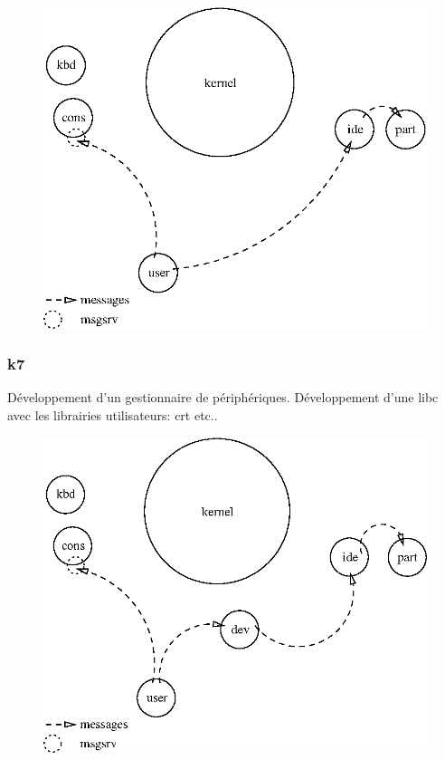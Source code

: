 \documentclass[10pt,a4wide]{article}
\begin{document}
\begin{figure}[h]
\centerline{\includegraphics{figures/k6.eps}}
\end{figure}

\newpage

\subsubsection{k7}

D\'eveloppement d'un gestionnaire de p\'eriph\'eriques. D\'eveloppement
d'une libc avec les librairies utilisateurs: crt etc..

\vspace{5cm}

\begin{figure}[h]
\centerline{\includegraphics{figures/k7.eps}}
\end{figure}
\end{document}
